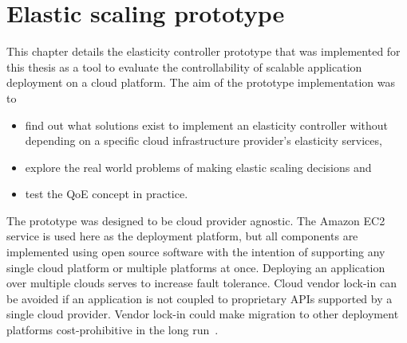 \documentclass[english]{tktltiki2}
\theoremstyle{definition}
\theoremstyle{remark}
\begin{document}








%
%
%
%
%

\section{Elastic scaling prototype}
\label{sec:elasticScalingPrototype}

This chapter details the elasticity controller prototype that was implemented
for this thesis as a tool to evaluate the controllability of scalable
application deployment on a cloud platform. The aim of the prototype
implementation was to

\begin{itemize}
	\item{find out what solutions exist to implement an elasticity controller
	 without depending on a specific cloud infrastructure provider's elasticity 
	 services,}
	\item{explore the real world problems of making elastic scaling decisions and}
	\item{test the QoE concept in practice.}
\end{itemize}

The prototype was designed to be cloud provider agnostic. The Amazon EC2 service is used here as the deployment platform, but all components are
implemented using open source software with the intention of supporting any
single cloud platform or multiple platforms at once. Deploying an application
over multiple clouds serves to increase fault tolerance. Cloud vendor lock-in can be avoided if an application is not coupled to proprietary APIs supported by a single cloud provider. Vendor lock-in could make migration to other deployment platforms cost-prohibitive in the long run~\cite{Petcu2012}.
\end{document}
